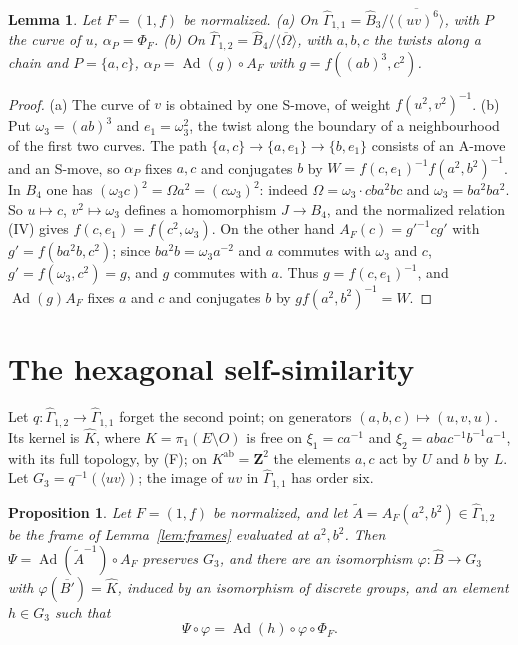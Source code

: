 \documentclass[11pt,a4paper]{article}
\theoremstyle{plain}
\newtheorem{lemma}[theorem]{Lemma}
\newtheorem{proposition}[theorem]{Proposition}
\theoremstyle{definition}
\theoremstyle{remark}
\newcommand{\Z}{\mathbf Z}
\newcommand{\Bh}{\widehat B}
\newcommand{\Gh}{\widehat\Gamma}
\newcommand{\Ad}{\operatorname{Ad}}
\newcommand{\ab}{\mathrm{ab}}
\begin{document}
\begin{lemma}\label{lem:lowgenus}
Let $F=(1,f)$ be normalized.
\textup{(a)} On $\Gh_{1,1}=\Bh_3/\overline{\langle(uv)^6\rangle}$, with $P$ the curve of $u$, $\alpha_P=\Phi_F$.
\textup{(b)} On $\Gh_{1,2}=\Bh_4/\overline{\langle\Omega\rangle}$, with $a,b,c$ the twists along a chain and
$P=\{a,c\}$, $\alpha_P=\Ad(g)\circ A_F$ with $g=f((ab)^3,c^2)$.
\end{lemma}

\begin{proof}
(a) The curve of $v$ is obtained by one S-move, of weight $f(u^2,v^2)^{-1}$. (b) Put $\omega_3=(ab)^3$ and
$e_1=\omega_3^2$, the twist along the boundary of a neighbourhood of the first two curves. The path
$\{a,c\}\to\{a,e_1\}\to\{b,e_1\}$ consists of an A-move and an S-move, so $\alpha_P$ fixes $a,c$ and conjugates $b$
by $W=f(c,e_1)^{-1}f(a^2,b^2)^{-1}$. In $B_4$ one has $(\omega_3c)^2=\Omega a^2=(c\omega_3)^2$: indeed
$\Omega=\omega_3\cdot cba^2bc$ and $\omega_3=ba^2ba^2$. So $u\mapsto c$, $v^2\mapsto\omega_3$ defines a homomorphism
$J\to B_4$, and the normalized relation (IV) gives $f(c,e_1)=f(c^2,\omega_3)$. On the other hand
$A_F(c)=g'^{-1}cg'$ with $g'=f(ba^2b,c^2)$; since $ba^2b=\omega_3a^{-2}$ and $a$ commutes with $\omega_3$ and $c$,
$g'=f(\omega_3,c^2)=g$, and $g$ commutes with $a$. Thus $g=f(c,e_1)^{-1}$, and $\Ad(g)A_F$ fixes $a$ and $c$ and
conjugates $b$ by $gf(a^2,b^2)^{-1}=W$.
\end{proof}

\section{The hexagonal self-similarity}\label{sec:H}

Let $q:\Gh_{1,2}\to\Gh_{1,1}$ forget the second point; on generators $(a,b,c)\mapsto(u,v,u)$. Its kernel is
$\widehat K$, where $K=\pi_1(E\setminus O)$ is free on $\xi_1=ca^{-1}$ and $\xi_2=abac^{-1}b^{-1}a^{-1}$, with its
full topology, by (F); on $K^{\ab}=\Z^2$ the elements $a,c$ act by $U$ and $b$ by $L$. Let
$G_3=q^{-1}(\langle uv\rangle)$; the image of $uv$ in $\Gh_{1,1}$ has order six.

\begin{proposition}\label{prop:H}
Let $F=(1,f)$ be normalized, and let $\tilde A=A_F(a^2,b^2)\in\Gh_{1,2}$ be the frame of Lemma~\ref{lem:frames}
evaluated at $a^2,b^2$. Then $\Psi=\Ad(\tilde A^{-1})\circ A_F$ preserves $G_3$, and there are an isomorphism
$\varphi:\Bh\to G_3$ with $\varphi(\overline{B'})=\widehat K$, induced by an isomorphism of discrete groups, and an
element $h\in G_3$ such that
\[
 \Psi\circ\varphi=\Ad(h)\circ\varphi\circ\Phi_F .
\]
\end{proposition}
\end{document}
